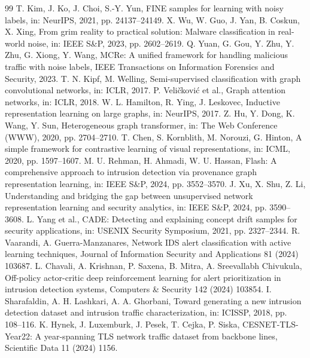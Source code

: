 \documentclass[pdflatex,referee,lineno,sn-basic,Numbered]{sn-jnl}
\begin{document}
\begin{thebibliography}{99}
 T. Kim, J. Ko, J. Choi, S.-Y. Yun, FINE samples for learning
with noisy labels, in: NeurIPS, 2021, pp. 24137--24149.
 X. Wu, W. Guo, J. Yan, B. Coskun, X. Xing, From grim reality
to practical solution: Malware classification in real-world noise, in: IEEE S\&P,
2023, pp. 2602--2619.
 Q. Yuan, G. Gou, Y. Zhu, Y. Zhu, G. Xiong, Y. Wang,
MCRe: A unified framework for handling malicious traffic with noise labels,
IEEE Transactions on Information Forensics and Security, 2023.
 T. N. Kipf, M. Welling, Semi-supervised classification with
graph convolutional networks, in: ICLR, 2017.
 P. Veli\v{c}kovi\'c et al., Graph attention networks,
in: ICLR, 2018.
 W. L. Hamilton, R. Ying, J. Leskovec, Inductive
representation learning on large graphs, in: NeurIPS, 2017.
 Z. Hu, Y. Dong, K. Wang, Y. Sun, Heterogeneous graph
transformer, in: The Web Conference (WWW), 2020, pp. 2704--2710.
 T. Chen, S. Kornblith, M. Norouzi, G. Hinton, A simple
framework for contrastive learning of visual representations, in: ICML, 2020,
pp. 1597--1607.
 M. U. Rehman, H. Ahmadi, W. U. Hassan, Flash: A
comprehensive approach to intrusion detection via provenance graph representation
learning, in: IEEE S\&P, 2024, pp. 3552--3570.
 J. Xu, X. Shu, Z. Li, Understanding and bridging the gap
between unsupervised network representation learning and security analytics, in:
IEEE S\&P, 2024, pp. 3590--3608.
 L. Yang et al., CADE: Detecting and explaining concept
drift samples for security applications, in: USENIX Security Symposium, 2021,
pp. 2327--2344.
 R. Vaarandi, A. Guerra-Manzanares, Network IDS alert
classification with active learning techniques, Journal of Information Security
and Applications 81 (2024) 103687.
 L. Chavali, A. Krishnan, P. Saxena, B. Mitra,
A. Sreevallabh Chivukula, Off-policy actor-critic deep reinforcement learning for
alert prioritization in intrusion detection systems, Computers \& Security 142
(2024) 103854.
 I. Sharafaldin, A. H. Lashkari, A. A. Ghorbani,
Toward generating a new intrusion detection dataset and intrusion traffic
characterization, in: ICISSP, 2018, pp. 108--116.
 K. Hynek, J. Luxemburk, J. Pesek, T. Cejka, P. Siska,
CESNET-TLS-Year22: A year-spanning TLS network traffic dataset from backbone
lines, Scientific Data 11 (2024) 1156.

\end{thebibliography}
\end{document}
